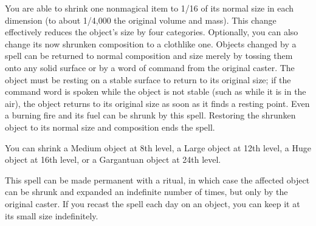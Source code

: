 \begin{spelleffect}
  You are able to shrink one nonmagical item to 1/16 of its normal size in each dimension (to about 1/4,000 the original volume and mass). This change effectively reduces the object's size by four categories. Optionally, you can also change its now shrunken composition to a clothlike one. Objects changed by a  spell can be returned to normal composition and size merely by tossing them onto any solid surface or by a word of command from the original caster. The object must be resting on a stable surface to return to its original size; if the command word is spoken while the object is not stable (such as while it is in the air), the object returns to its original size as soon as it finds a resting point. Even a burning fire and its fuel can be shrunk by this spell. Restoring the shrunken object to its normal size and composition ends the spell.
  \par You can shrink a Medium object at 8th level, a Large object at 12th level, a Huge object at 16th level, or a Gargantuan object at 24th level.
\end{spelleffect}
\begin{spellnotes}
This spell can be made permanent with a  ritual, in which case the affected object can be shrunk and expanded an indefinite number of times, but only by the original caster. If you recast the spell each day on an object, you can keep it at its small size indefinitely.
\end{spellnotes}

